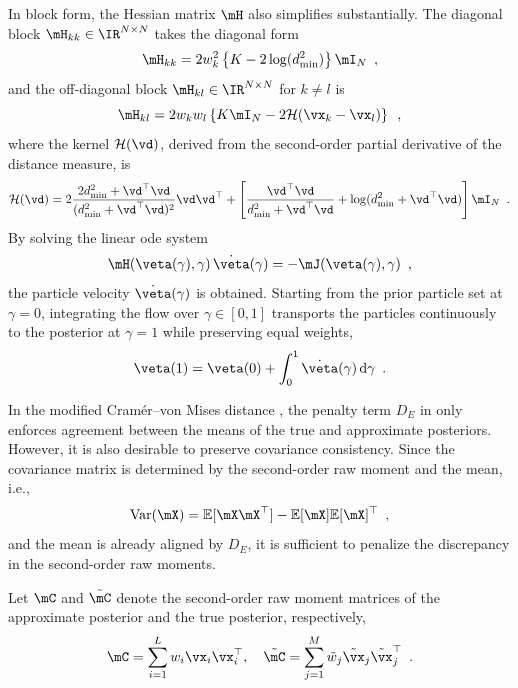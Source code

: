In block form, the Hessian matrix $\mH$ also simplifies substantially. The diagonal block $\mH_{kk} \in \IR^{N \times N}$ takes the diagonal form
\begin{equation}
	\mH_{kk} = 2 w_k^2 \left\{ K - 2 \log(d_{\min}^2) \right\} \mI_N \enspace,
\end{equation}
and the off-diagonal block $\mH_{kl} \in \IR^{N \times N}$ for $k \neq l$ is
\begin{equation}
	\mH_{kl} = 2 w_k w_l \left\{ K \mI_N - 2\mathcal{H}(\vx_k - \vx_l) \right\} \enspace,
	\label{eq:Hkl}
\end{equation}
where the kernel $\mathcal{H}(\vd)$, derived from the second-order partial derivative of the distance measure, is
\begin{equation}
	\mathcal{H}(\vd) = 2\frac{2 d_{\min}^2 + \vd^{\top}\vd}{(d_{\min}^2 + \vd^{\top}\vd)^2} \vd\vd^{\top} + \left[ \frac{\vd^{\top}\vd}{d_{\min}^2 + \vd^{\top}\vd} + \log(d_{\min}^2 + \vd^{\top}\vd) \right] \mI_N \enspace.
	\label{eq:h}
\end{equation}
By solving the linear \ac{ode} system
\[
\mH(\veta(\gamma),\gamma)\,\dot{\veta}(\gamma)=-\mJ(\veta(\gamma),\gamma)\enspace,
\]
the particle velocity \(\dot{\veta}(\gamma)\) is obtained. Starting from the prior particle set at \(\gamma=0\), integrating the flow over \(\gamma\in[0,1]\) transports the particles continuously to the posterior at \(\gamma=1\) while preserving equal weights,
\begin{equation}
\veta(1)=\veta(0)+\int_{0}^{1}\dot{\veta}(\gamma)\,\mathrm d\gamma\enspace.
\label{eq:eta_flow_prior_posterior}
\end{equation}

In the modified Cramér--von Mises distance , the penalty term $D_E$ in  only enforces agreement between the means of the true and approximate posteriors. However, it is also desirable to preserve covariance consistency. Since the covariance matrix is determined by the second-order raw moment and the mean, i.e.,
\[
\text{Var}(\mX) = \mathbb{E}[\mX\mX^{\top}] - \mathbb{E}[\mX]\mathbb{E}[\mX]^{\top} \enspace,
\]
and the mean is already aligned by $D_E$, it is sufficient to penalize the discrepancy in the second-order raw moments.

Let $\mC$ and $\tilde{\mC}$ denote the second-order raw moment matrices of the approximate posterior and the true posterior, respectively,
\begin{equation}
	\mC = \sum_{i=1}^L w_i \vx_i \vx_i^{\top}, \quad \tilde{\mC} = \sum_{j=1}^M \tilde{w}_j \tilde{\vx}_j \tilde{\vx}_j^{\top} \enspace.
\end{equation}

